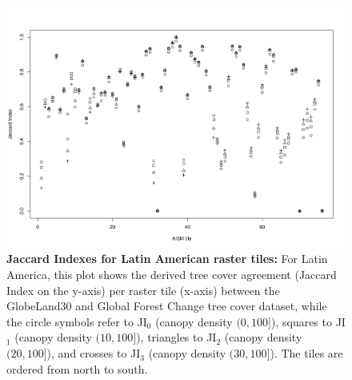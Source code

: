 	\begin{landscape}
		\begin{figure}[ht]
				\centering
				\includegraphics[scale=.65]{img/jaccard_tiles_americas}
				\caption[Jaccard Indexes for Latin American raster tiles]{\textbf{Jaccard Indexes for Latin American raster tiles:} For Latin America, this plot shows the derived tree cover agreement (Jaccard Index on the y-axis) per raster tile (x-axis) between the GlobeLand30 and Global Forest Change tree cover dataset, while the circle symbols refer to JI$_0$ (canopy density $(0,100]$), squares to JI$_1$ (canopy density $(10,100]$), triangles to JI$_2$ (canopy density $(20,100]$), and crosses to JI$_3$ (canopy density $(30,100]$). The tiles are ordered from north to south.}
				\label{fig:jaccard_americas_appendix}
		\end{figure}
	\end{landscape}

